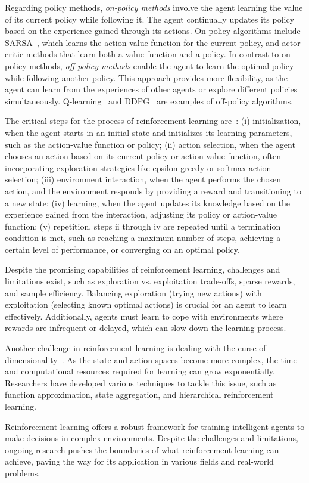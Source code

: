 Regarding policy methods, \emph{on-policy methods} involve the agent learning the value of its current policy while following it.
The agent continually updates its policy based on the experience gained through its actions.
On-policy algorithms include SARSA~\cite{rummery1994}, which learns the action-value function for the current policy, and actor-critic methods that learn both a value function and a policy.
In contrast to on-policy methods, \emph{off-policy methods} enable the agent to learn the optimal policy while following another policy.
This approach provides more flexibility, as the agent can learn from the experiences of other agents or explore different policies simultaneously.
Q-learning~\cite{watkins1992} and \ac{DDPG}~\cite{wang2022} are examples of off-policy algorithms.

The critical steps for the process of reinforcement learning are~\cite{sutton1998}:
(i) initialization, when the agent starts in an initial state and initializes its learning parameters, such as the action-value function or policy;
(ii) action selection, when the agent chooses an action based on its current policy or action-value function, often incorporating exploration strategies like epsilon-greedy or softmax action selection;
(iii) environment interaction, when the agent performs the chosen action, and the environment responds by providing a reward and transitioning to a new state;
(iv) learning, when the agent updates its knowledge based on the experience gained from the interaction, adjusting its policy or action-value function;
(v) repetition, steps ii through iv are repeated until a termination condition is met, such as reaching a maximum number of steps, achieving a certain level of performance, or converging on an optimal policy.

Despite the promising capabilities of reinforcement learning, challenges and limitations exist, such as exploration vs. exploitation trade-offs, sparse rewards, and sample efficiency.
Balancing exploration (trying new actions) with exploitation (selecting known optimal actions) is crucial for an agent to learn effectively.
Additionally, agents must learn to cope with environments where rewards are infrequent or delayed, which can slow down the learning process.

Another challenge in reinforcement learning is dealing with the curse of dimensionality~\cite{weber1998}.
As the state and action spaces become more complex, the time and computational resources required for learning can grow exponentially.
Researchers have developed various techniques to tackle this issue, such as function approximation, state aggregation, and hierarchical reinforcement learning.

Reinforcement learning offers a robust framework for training intelligent agents to make decisions in complex environments.
Despite the challenges and limitations, ongoing research pushes the boundaries of what reinforcement learning can achieve, paving the way for its application in various fields and real-world problems.
